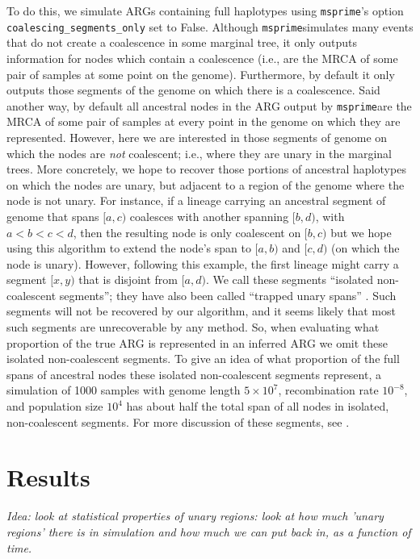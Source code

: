 \documentclass[10pt,twoside,lineno]{gsajnl}
\newcommand{\msprime}{\texttt{msprime}}
\newcommand{\comment}[1]{{\color{violet} \it #1}}
\begin{document}
To do this, we simulate ARGs containing full haplotypes using \msprime's 
option \texttt{coalescing\_segments\_only} set to False.
Although \msprime simulates many events that do not create a coalescence in some marginal tree,
it only outputs information for nodes which contain a coalescence
(i.e., are the MRCA of some pair of samples at some point on the genome).
Furthermore, by default it only outputs those segments of the genome
on which there is a coalescence.
Said another way, by default all ancestral nodes in the ARG
output by \msprime are the MRCA of some pair of samples at every point in the genome
on which they are represented.
However, here we are interested in those segments of genome
on which the nodes are \emph{not} coalescent;
i.e., where they are unary in the marginal trees.
More concretely, we hope to recover those portions of ancestral haplotypes
on which the nodes are unary, but adjacent to a region of the genome where the node is not unary.
For instance, if a lineage carrying an ancestral segment of genome that spans $[a, c)$
coalesces with another spanning $[b, d)$, with $a < b < c < d$,
then the resulting node is only coalescent on $[b, c)$ but we hope using this algorithm
to extend the node's span to $[a, b)$ and $[c, d)$
(on which the node is unary).
However, following this example, the first lineage might carry a segment $[x, y)$
that is disjoint from $[a, d)$.
We call these segments ``isolated non-coalescent segments'';
they have also been called ``trapped unary spans'' \citep[by][]{XXX}.
Such segments will not be recovered by our algorithm,
and it seems likely that most such segments are unrecoverable by any method.
So, when evaluating what proportion of the true ARG is represented in an inferred ARG
we omit these isolated non-coalescent segments.
To give an idea of what proportion of the full spans of ancestral nodes
these isolated non-coalescent segments represent,
a simulation of 1000 samples
with genome length $5\times 10^7$, recombination rate $10^{-8}$, and population size $10^4$
has about half the total span of all nodes in isolated, non-coalescent segments.
For more discussion of these segments, see \citet{baumdicker2021efficient}.


\section{Results}

\comment{
    Idea: look at statistical properties of unary regions:
    look at how much 'unary regions' there is in simulation
    and how much we can put back in,
    as a function of time.
}
\end{document}

